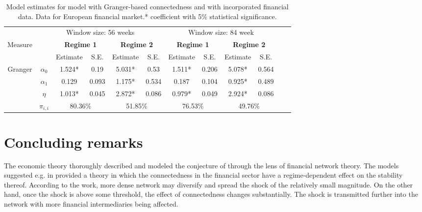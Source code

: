 \documentclass[12pt]{article}
\begin{document}
\begin{table}\small
	\begin{tabular}{cccccc | cccccc}
		& \multicolumn{5}{c}{Window size: 56 weeks} & \multicolumn{4}{c}{Window size: 84 week} \\
		Measure &  & \multicolumn{2}{c}{\bfseries Regime 1} & \multicolumn{2}{c}{\bfseries Regime 2} & \multicolumn{2}{c}{\bfseries Regime 1} & \multicolumn{2}{c}{\bfseries Regime 2} \\
		\hline
		& & Estimate & S.E. & Estimate & S.E. & Estimate & S.E. & Estimate & S.E. \\
		\hline
		\multirow{3}{*}[\normalbaselineskip]{Granger} & $\alpha_0$ & 1.524* & 0.19 & 5.031* & 0.53 & 1.511* & 0.206 & 5.078* & 0.564 \\
		& $\alpha_1$ & 0.129 & 0.093 & 1.175* & 0.534 & 0.187 & 0.104 & 0.925* & 0.489\\
		& $\eta$ & 1.013* & 0.045 & 2.872* & 0.086 & 0.979* & 0.049 & 2.924* & 0.086\\
		& $\pi_{i,i}$ &  \multicolumn{2}{c}{80.36\%} & \multicolumn{2}{c|}{51.85\%} & \multicolumn{2}{c}{76.53\%} & \multicolumn{2}{c}{49.76\%}\\
		\hline
	\end{tabular}
	\caption{Model estimates for model with Granger-based connectedness and with incorporated financial data. Data for European financial market.* coefficient with 5\% statistical significance.}
	\label{table:model_robust}
\end{table}

\section{Concluding remarks}\label{section:conclusion}

The economic theory thoroughly described and modeled the conjecture of \citet{haldane13} through the lens of financial network theory. The models suggested e.g. in \citet{acemoglu13} provided a theory in which the connectedness in the financial sector have a regime-dependent effect on the stability thereof. According to the work, more dense network may diversify and spread the shock of the relatively small magnitude. On the other hand, once the shock is above some threshold, the effect of connectedness changes substantially. The shock is transmitted further into the network with more financial intermediaries being affected.
\end{document}
